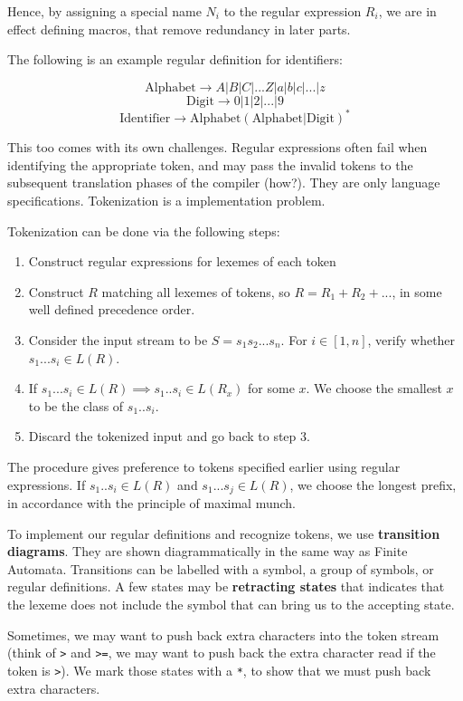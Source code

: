 \documentclass[12pt,letterpaper]{amsbook}
\theoremstyle{definition}
\begin{document}
Hence, by assigning a special name $N_i$ to the regular expression $R_i$, we are in effect defining macros, that remove redundancy in later parts.

The following is an example regular definition for identifiers:

\[\text{Alphabet} \rightarrow A|B|C|...Z|a|b|c|...|z\]
\[\text{Digit} \rightarrow 0|1|2|...|9\]
\[\text{Identifier} \rightarrow \text{Alphabet}(\text{Alphabet} | \text{Digit})^*\]

This too comes with its own challenges. Regular expressions often fail when identifying the appropriate token, and may pass the invalid tokens to the subsequent translation phases of the compiler (how?). They are only language specifications. Tokenization is a implementation problem.

Tokenization can be done via the following steps:

\begin{enumerate}
  \item Construct regular expressions for lexemes of each token
  \item Construct $R$ matching all lexemes of tokens, so $R = R_1+R_2+...$, in some well defined precedence order.
  \item Consider the input stream to be $S=s_1s_2...s_n$. For $i \in [1,n]$, verify whether $s_1...s_i \in L(R)$.
  \item If $s_1...s_i \in L(R) \implies s_1..s_i \in L(R_x)$ for some $x$. We choose the smallest $x$ to be the class of $s_1..s_i$. 
  \item Discard the tokenized input and go back to step 3.
\end{enumerate}

The procedure gives preference to tokens specified earlier using regular expressions. If $s_1..s_i \in L(R)$ and $s_1...s_j \in L(R)$, we choose the longest prefix, in accordance with the principle of maximal munch.

To implement our regular definitions and recognize tokens, we use \textbf{transition diagrams}. They are shown diagrammatically in the same way as Finite Automata. Transitions can be labelled with a symbol, a group of symbols, or regular definitions. A few states may be \textbf{retracting states} that indicates that the lexeme does not include the symbol that can bring us to the accepting state.

Sometimes, we may want to push back extra characters into the token stream (think of \texttt{>} and \texttt{>=}, we may want to push back the extra character read if the token is \texttt{>}). We mark those states with a \texttt{*}, to show that we must push back extra characters.
\end{document}
